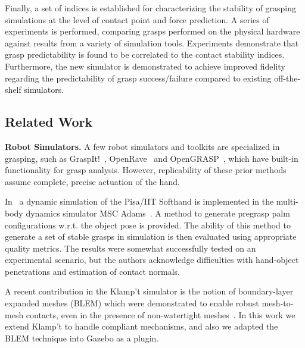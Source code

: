 Finally, a set of indices is established for characterizing the stability of grasping simulations at the level of contact point and force prediction.  A  series of experiments is performed, comparing grasps performed on the physical hardware against results from a variety of simulation tools. Experiments demonstrate that grasp predictability is found to be correlated to the contact stability indices.  Furthermore, the new simulator is demonstrated to achieve improved fidelity regarding the predictability of grasp success/failure compared to existing off-the-shelf simulators.  


\subsection{Related Work}\label{related_work_grasp}
{\bf Robot Simulators.}
A few robot simulators and toolkits are specialized in grasping, such as GraspIt!~\cite{Miller04}, OpenRave~\cite{Diankov08OpenRAVE} and OpenGRASP~\cite{Leon10OpenGRASP}, which have built-in functionality for grasp analysis. However, replicability of these prior methods assume complete, precise actuation of the hand.

In~\cite{Bonilla14} a dynamic simulation of the Pisa/IIT Softhand is implemented in the multi-body dynamics simulator MSC Adams~\cite{MSCAdams}. A method to generate pregrasp palm configurations w.r.t. the object pose is provided. The ability of this method to generate a set of stable grasps in simulation is then evaluated using  appropriate quality metrics. The results were somewhat successfully tested on an experimental scenario, but the authors acknowledge difficulties with hand-object penetrations and estimation of contact normals.

 A recent contribution in the Klamp't simulator is the notion of boundary-layer expanded meshes (BLEM) which were demonstrated to enable robust mesh-to-mesh contacts, even in the presence of non-watertight meshes~\cite{Hauser13BLEM}. In this work we extend Klamp't to handle compliant mechanisms, and also we adapted the BLEM technique into Gazebo as a plugin.

